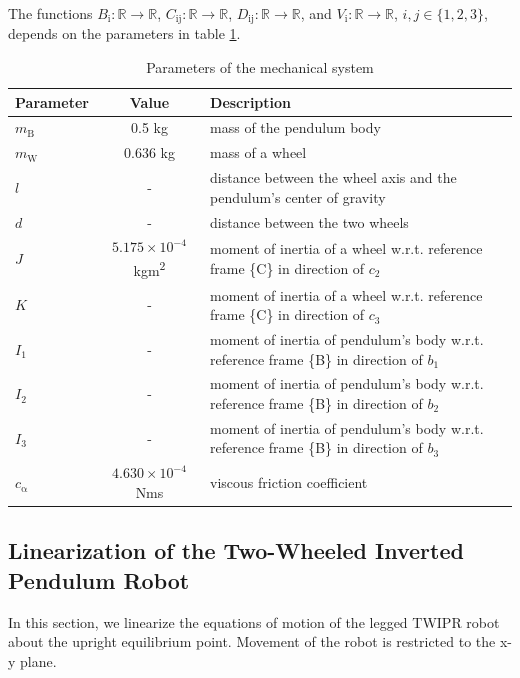 The functions $B_{\mathrm{i}}: \mathbb{R} \rightarrow \mathbb{R}$, $C_{\mathrm{ij}}: \mathbb{R} \rightarrow \mathbb{R}$, $D_{\mathrm{ij}}: \mathbb{R} \rightarrow \mathbb{R}$, and $V_{\mathrm{i}}: \mathbb{R} \rightarrow \mathbb{R}$, $i,j \in \{1,2,3\}$, depends on the parameters in table \ref{tab:parameters}.
    \begin{table}[h]
        \centering
        \caption{Parameters of the mechanical system}
        \label{tab:parameters}
        \begin{tabular}{lcl}
            \toprule
            Parameter & Value & Description \\
            \midrule
            $m_{\mathrm{B}}$ & 0.5 kg & mass of the pendulum body \\
            $m_{\mathrm{W}}$ & 0.636 kg & mass of a wheel \\
            $l$ & - & distance between the wheel axis and the pendulum's center of gravity \\
            $d$ & - & distance between the two wheels \\
            $J$ & \(5.175 \times 10^{-4}\) kgm\textsuperscript{2} & moment of inertia of a wheel w.r.t. reference frame \{C\} in direction of \(c_{\mathrm{2}}\) \\
            $K$ & - & moment of inertia of a wheel w.r.t. reference frame \{C\} in direction of \(c_{\mathrm{3}}\) \\
            $I_{\mathrm{1}}$ & - & moment of inertia of pendulum's body w.r.t. reference frame \{B\} in direction of \(b_{\mathrm{1}}\) \\
            $I_{\mathrm{2}}$ & - & moment of inertia of pendulum's body w.r.t. reference frame \{B\} in direction of \(b_{\mathrm{2}}\) \\
            $I_{\mathrm{3}}$ & - & moment of inertia of pendulum's body w.r.t. reference frame \{B\} in direction of \(b_{\mathrm{3}}\) \\
            $c_{\mathrm{\alpha}}$ & \(4.630 \times 10^{-4}\) Nms & viscous friction coefficient \\
            \bottomrule
        \end{tabular}
    \end{table}

	
	

\subsection{Linearization of the Two-Wheeled Inverted Pendulum Robot}
In this section, we linearize the equations of motion of the legged TWIPR robot about the upright equilibrium point. Movement of the robot is restricted to the x-y plane.

